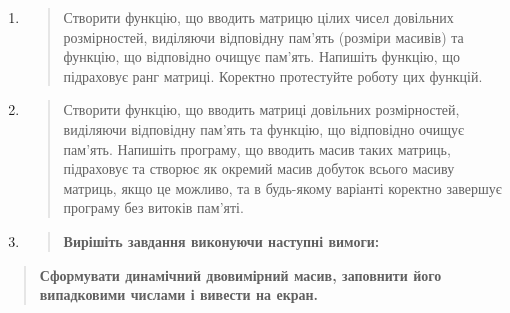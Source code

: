 \documentclass[]{article}
\begin{document}
\begin{enumerate}
\def\labelenumi{\arabic{enumi})}
\item
  \begin{quote}
  Створити функцію, що вводить матрицю цілих чисел довільних
  розмірностей, виділяючи відповідну пам'ять (розміри масивів) та
  функцію, що відповідно очищує пам'ять. Напишіть функцію, що підраховує
  ранг матриці. Коректно протестуйте роботу цих функцій.
  \end{quote}
\item
  \begin{quote}
  Створити функцію, що вводить матриці довільних розмірностей, виділяючи
  відповідну пам'ять та функцію, що відповідно очищує пам'ять. Напишіть
  програму, що вводить масив таких матриць, підраховує та створює як
  окремий масив добуток всього масиву матриць, якщо це можливо, та в
  будь-якому варіанті коректно завершує програму без витоків пам'яті.
  \end{quote}
\item
  \begin{quote}
  \textbf{Вирішіть завдання виконуючи наступні вимоги:}
  \end{quote}
\end{enumerate}

\begin{quote}
\textbf{Сформувати динамічний двовимірний масив, заповнити його
випадковими числами і вивести на екран.}
\end{quote}
\end{document}
